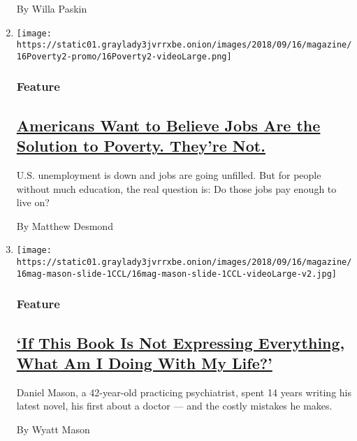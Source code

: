 \begin{enumerate}
  By Willa Paskin
\item
  \texttt{[image: https://static01.graylady3jvrrxbe.onion/images/2018/09/16/magazine/16Poverty2-promo/16Poverty2-videoLarge.png]}

  \hypertarget{feature-2}{%
  \subsubsection{Feature}\label{feature-2}}

  \hypertarget{americans-want-to-believe-jobs-are-the-solution-to-poverty-theyre-not}{%
  \subsection{\texorpdfstring{\href{/2018/09/11/magazine/americans-jobs-poverty-homeless.html}{Americans
  Want to Believe Jobs Are the Solution to Poverty. They're
  Not.}}{Americans Want to Believe Jobs Are the Solution to Poverty. They're Not.}}\label{americans-want-to-believe-jobs-are-the-solution-to-poverty-theyre-not}}

  U.S. unemployment is down and jobs are going unfilled. But for people
  without much education, the real question is: Do those jobs pay enough
  to live on?

  By Matthew Desmond
\item
  \texttt{[image: https://static01.graylady3jvrrxbe.onion/images/2018/09/16/magazine/16mag-mason-slide-1CCL/16mag-mason-slide-1CCL-videoLarge-v2.jpg]}

  \hypertarget{feature-3}{%
  \subsubsection{Feature}\label{feature-3}}

  \hypertarget{if-this-book-is-not-expressing-everything-what-am-i-doing-with-my-life}{%
  \subsection{\texorpdfstring{\href{/2018/09/12/magazine/if-this-book-is-not-expressing-everything-what-am-i-doing-with-my-life.html}{`If
  This Book Is Not Expressing Everything, What Am I Doing With My
  Life?'}}{`If This Book Is Not Expressing Everything, What Am I Doing With My Life?'}}\label{if-this-book-is-not-expressing-everything-what-am-i-doing-with-my-life}}

  Daniel Mason, a 42-year-old practicing psychiatrist, spent 14 years
  writing his latest novel, his first about a doctor --- and the costly
  mistakes he makes.

  By Wyatt Mason
\end{enumerate}

